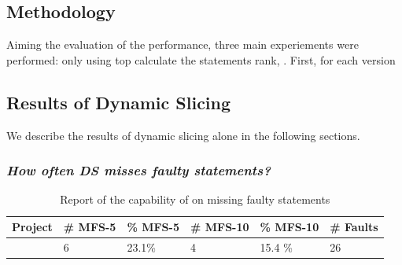 \documentclass{article}
\begin{document}


\subsection{Methodology}

Aiming the evaluation of the \comb{} performance, three main 
experiements were performed: only using \sfl{} top calculate the statements
rank, . First, for each version 

\subsection{Results of Dynamic Slicing}

We describe the results of dynamic slicing alone in the following sections.

\subsubsection{\textit{How often DS misses faulty statements?}}


\begin{table}[h]
	\centering
	\setlength{\tabcolsep}{4pt}
	\begin{tabular}{llllll}
		\toprule
		Project             &  \# MFS-5  & \% MFS-5 & \# MFS-10 & \% MFS-10 & \# Faults \\ %
		\midrule
		\chart{}  & 6 & 23.1\% & 4 & 15.4 \%  & 26\\ %
		\bottomrule
	\end{tabular}
	\caption {Report of the capability of \ds{} on missing faulty statements}
\end{table}
\normalsize
\end{document}
